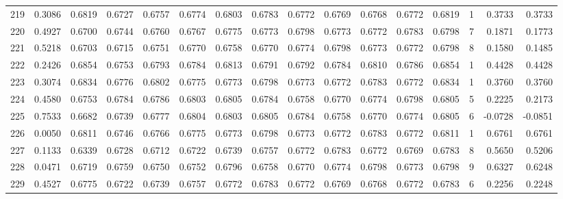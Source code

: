 \begin{tabular}{lrrrrrrrrrrrrrrr}
219 &      0.3086 &  0.6819 &  0.6727 &  0.6757 &  0.6774 &  0.6803 &  0.6783 &  0.6772 &  0.6769 &  0.6768 &   0.6772 &     0.6819 &      1 &                    0.3733 &                     0.3733 \\
220 &      0.4927 &  0.6700 &  0.6744 &  0.6760 &  0.6767 &  0.6775 &  0.6773 &  0.6798 &  0.6773 &  0.6772 &   0.6783 &     0.6798 &      7 &                    0.1871 &                     0.1773 \\
221 &      0.5218 &  0.6703 &  0.6715 &  0.6751 &  0.6770 &  0.6758 &  0.6770 &  0.6774 &  0.6798 &  0.6773 &   0.6772 &     0.6798 &      8 &                    0.1580 &                     0.1485 \\
222 &      0.2426 &  0.6854 &  0.6753 &  0.6793 &  0.6784 &  0.6813 &  0.6791 &  0.6792 &  0.6784 &  0.6810 &   0.6786 &     0.6854 &      1 &                    0.4428 &                     0.4428 \\
223 &      0.3074 &  0.6834 &  0.6776 &  0.6802 &  0.6775 &  0.6773 &  0.6798 &  0.6773 &  0.6772 &  0.6783 &   0.6772 &     0.6834 &      1 &                    0.3760 &                     0.3760 \\
224 &      0.4580 &  0.6753 &  0.6784 &  0.6786 &  0.6803 &  0.6805 &  0.6784 &  0.6758 &  0.6770 &  0.6774 &   0.6798 &     0.6805 &      5 &                    0.2225 &                     0.2173 \\
225 &      0.7533 &  0.6682 &  0.6739 &  0.6777 &  0.6804 &  0.6803 &  0.6805 &  0.6784 &  0.6758 &  0.6770 &   0.6774 &     0.6805 &      6 &                   -0.0728 &                    -0.0851 \\
226 &      0.0050 &  0.6811 &  0.6746 &  0.6766 &  0.6775 &  0.6773 &  0.6798 &  0.6773 &  0.6772 &  0.6783 &   0.6772 &     0.6811 &      1 &                    0.6761 &                     0.6761 \\
227 &      0.1133 &  0.6339 &  0.6728 &  0.6712 &  0.6722 &  0.6739 &  0.6757 &  0.6772 &  0.6783 &  0.6772 &   0.6769 &     0.6783 &      8 &                    0.5650 &                     0.5206 \\
228 &      0.0471 &  0.6719 &  0.6759 &  0.6750 &  0.6752 &  0.6796 &  0.6758 &  0.6770 &  0.6774 &  0.6798 &   0.6773 &     0.6798 &      9 &                    0.6327 &                     0.6248 \\
229 &      0.4527 &  0.6775 &  0.6722 &  0.6739 &  0.6757 &  0.6772 &  0.6783 &  0.6772 &  0.6769 &  0.6768 &   0.6772 &     0.6783 &      6 &                    0.2256 &                     0.2248 \\

\end{tabular}
